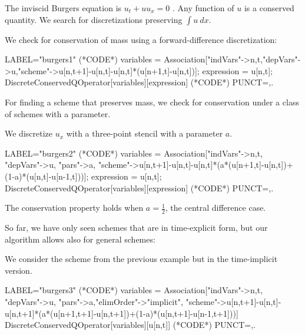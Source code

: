 \documentclass[runningheads]{llncs}
\newcommand{\1}{\chi}
\begin{document}
The inviscid Burgers equation is $u_t+uu_x=0$ \cite{smoller94}. Any function of $u$ is a conserved quantity. We search for discretizations preserving $\int u\ dx$.
\begin{example}
	We check for conservation of mass using a forward-difference discretization:
	\begin{EXE}
		LABEL="burgers1"
		(*CODE*)
		variables = Association["indVars"->{n,t},"depVars"->{u},"scheme"->{u[n,t+1]-u[n,t]-u[n,t]*(u[n+1,t]-u[n,t])}];
		expression = u[n,t];
		DiscreteConservedQOperator[variables][expression]
		(*CODE*)
		PUNCT={,.}
	\end{EXE}
	\begin{small}
		
		
	\end{small}
\end{example}
For finding a scheme that preserves mass, we check for conservation under a class of schemes with a parameter.
\begin{example}
	We discretize $u_x$ with a three-point stencil with a parameter $a$.
	\begin{EXE}
		LABEL="burgers2"
		(*CODE*)
		variables = Association["indVars"->{n,t}, "depVars"->{u}, "pars"->{a}, "scheme"->{u[n,t+1]-u[n,t]-u[n,t]*(a*(u[n+1,t]-u[n,t])+(1-a)*(u[n,t]-u[n-1,t]))}];
		expression = u[n,t];
		DiscreteConservedQOperator[variables][expression]
		(*CODE*)
		PUNCT={,.}
	\end{EXE}
	\begin{small}
		
		
	\end{small}
The conservation property holds when $a=\frac{1}{2}$, the central difference case.
\end{example}
So far, we have only seen schemes that are in time-explicit form, but our algorithm allows also for general schemes:
\begin{example}
	We consider the scheme from the previous example but in the time-implicit version.
	\begin{EXE}
		LABEL="burgers3"
		(*CODE*)
		variables = Association["indVars"->{n,t}, "depVars"->{u}, "pars"->{a},"elimOrder"->"implicit", "scheme"->{u[n,t+1]-u[n,t]-u[n,t+1]*(a*(u[n+1,t+1]-u[n,t+1])+(1-a)*(u[n,t+1]-u[n-1,t+1]))}]
		DiscreteConservedQOperator[variables][u[n,t]]
		(*CODE*)
		PUNCT={,.}
	\end{EXE}
	\begin{small}
		
		
	\end{small}
\end{example}
\end{document}
